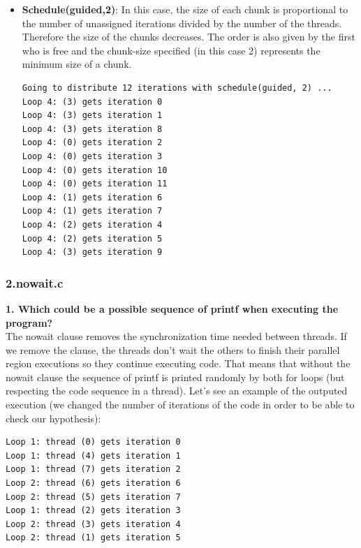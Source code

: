 \documentclass[12]{article}
\begin{document}
\begin{itemize}
\item \textbf{Schedule(guided,2)}: In this case, the size of each chunk is proportional to the number of unassigned iterations divided by the number of the threads. Therefore the size of the chunks decreases. The order is also given by the first who is free and the chunk-size specified (in this case 2) represents the minimum size of a chunk. 
\\
\begin{lstlisting}[frame=single]
Going to distribute 12 iterations with schedule(guided, 2) ...
Loop 4: (3) gets iteration 0
Loop 4: (3) gets iteration 1
Loop 4: (3) gets iteration 8
Loop 4: (0) gets iteration 2
Loop 4: (0) gets iteration 3
Loop 4: (0) gets iteration 10
Loop 4: (0) gets iteration 11
Loop 4: (1) gets iteration 6
Loop 4: (1) gets iteration 7
Loop 4: (2) gets iteration 4
Loop 4: (2) gets iteration 5
Loop 4: (3) gets iteration 9
\end{lstlisting}
\end{itemize}


\subsubsection{2.nowait.c}
\textbf{1. Which could be a possible sequence of printf when executing the program?}
\\
The nowait clause removes the synchronization time needed between threads. If we remove the clause, the threads don't wait the others to finish their parallel region executions so they continue executing code. That means that without the nowait clause the sequence of printf is printed randomly by both for loops (but respecting the code sequence in a thread). 
Let's see an example of the outputed execution (we changed the number of iterations of the code in order to be able to check our hypothesis): 
\\
\begin{lstlisting}[frame=single]
Loop 1: thread (0) gets iteration 0
Loop 1: thread (4) gets iteration 1
Loop 1: thread (7) gets iteration 2
Loop 2: thread (6) gets iteration 6
Loop 2: thread (5) gets iteration 7
Loop 1: thread (2) gets iteration 3
Loop 2: thread (3) gets iteration 4
Loop 2: thread (1) gets iteration 5

\end{lstlisting}
\end{document}

